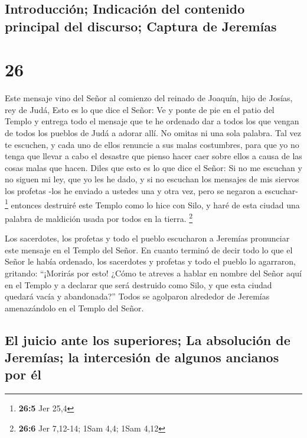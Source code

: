 \hypertarget{introducciuxf3n-indicaciuxf3n-del-contenido-principal-del-discurso-captura-de-jeremuxedas}{%
\subsection{Introducción; Indicación del contenido principal del
discurso; Captura de
Jeremías}\label{introducciuxf3n-indicaciuxf3n-del-contenido-principal-del-discurso-captura-de-jeremuxedas}}

\hypertarget{section-25}{%
\section{26}\label{section-25}}

 Este mensaje vino del Señor al comienzo del reinado de
Joaquín, hijo de Josías, rey de Judá,  Esto es lo que dice
el Señor: Ve y ponte de pie en el patio del Templo y entrega todo el
mensaje que te he ordenado dar a todos los que vengan de todos los
pueblos de Judá a adorar allí. No omitas ni una sola palabra.
 Tal vez te escuchen, y cada uno de ellos renuncie a sus
malas costumbres, para que yo no tenga que llevar a cabo el desastre que
pienso hacer caer sobre ellos a causa de las cosas malas que hacen.
 Diles que esto es lo que dice el Señor: Si no me escuchan
y no siguen mi ley, que yo les he dado,  y si no escuchan
los mensajes de mis siervos los profetas -los he enviado a ustedes una y
otra vez, pero se negaron a escuchar- \footnote{\textbf{26:5} Jer 25,4}
 entonces destruiré este Templo como lo hice con Silo, y
haré de esta ciudad una palabra de maldición usada por todos en la
tierra. \footnote{\textbf{26:6} Jer 7,12-14; 1Sam 4,4; 1Sam 4,12}

 Los sacerdotes, los profetas y todo el pueblo escucharon
a Jeremías pronunciar este mensaje en el Templo del Señor.
 En cuanto terminó de decir todo lo que el Señor le había
ordenado, los sacerdotes y profetas y todo el pueblo lo agarraron,
gritando: ``¡Morirás por esto!  ¿Cómo te atreves a hablar
en nombre del Señor aquí en el Templo y a declarar que será destruido
como Silo, y que esta ciudad quedará vacía y abandonada?'' Todos se
agolparon alrededor de Jeremías amenazándolo en el Templo del Señor.

\hypertarget{el-juicio-ante-los-superiores-la-absoluciuxf3n-de-jeremuxedas-la-intercesiuxf3n-de-algunos-ancianos-por-uxe9l}{%
\subsection{El juicio ante los superiores; La absolución de Jeremías; la
intercesión de algunos ancianos por
él}\label{el-juicio-ante-los-superiores-la-absoluciuxf3n-de-jeremuxedas-la-intercesiuxf3n-de-algunos-ancianos-por-uxe9l}}

